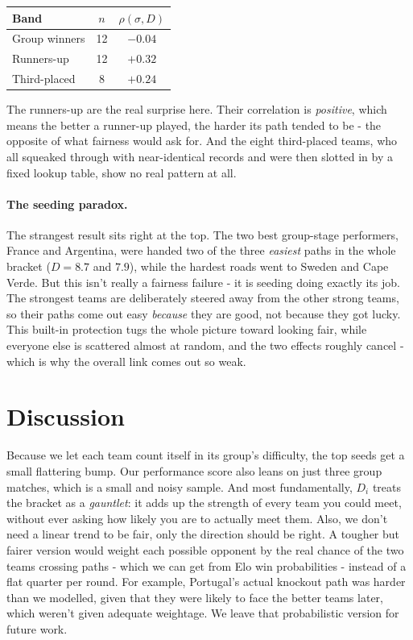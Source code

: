 \documentclass[11pt]{article}
\newcommand{\Dif}{D}                 %
\newcommand{\str}{\sigma}            %
\begin{document}
\begin{center}
\begin{tabular}{@{}lcc@{}}
\toprule
Band & $n$ & $\rho(\str,\Dif)$ \\
\midrule
Group winners & 12 & $-0.04$ \\
Runners-up & 12 & $+0.32$ \\
Third-placed & 8 & $+0.24$ \\
\bottomrule
\end{tabular}
\end{center}

The runners-up are the real surprise here. Their correlation is \emph{positive}, which means the better a runner-up played, the harder its path tended to be - the opposite of what fairness would ask for. And the eight third-placed teams, who all squeaked through with near-identical records and were then slotted in by a fixed lookup table, show no real pattern at all.

\paragraph{The seeding paradox.} The strangest result sits right at the top. The two best group-stage performers, France and Argentina, were handed two of the three \emph{easiest} paths in the whole bracket ($\Dif = 8.7$ and $7.9$), while the hardest roads went to Sweden and Cape Verde. But this isn't really a fairness failure - it is seeding doing exactly its job. The strongest teams are deliberately steered away from the other strong teams, so their paths come out easy \emph{because} they are good, not because they got lucky. This built-in protection tugs the whole picture toward looking fair, while everyone else is scattered almost at random, and the two effects roughly cancel - which is why the overall link comes out so weak.

\FloatBarrier
\section{Discussion}
\label{sec:discussion}

Because we let each team count itself in its group's difficulty, the top seeds get a small flattering bump. Our performance score also leans on just three group matches, which is a small and noisy sample. And most fundamentally, $\Dif_i$ treats the bracket as a \emph{gauntlet}: it adds up the strength of every team you could meet, without ever asking how likely you are to actually meet them. Also, we don't need a linear trend to be fair, only the direction should be right. A tougher but fairer version would weight each possible opponent by the real chance of the two teams crossing paths - which we can get from Elo win probabilities - instead of a flat quarter per round. For example, Portugal's actual knockout path was harder than we modelled, given that they were likely to face the better teams later, which weren't given adequate weightage. We leave that probabilistic version for future work.
\end{document}

